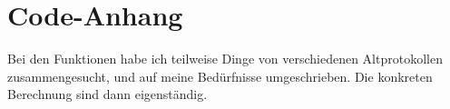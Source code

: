 \section{Code-Anhang}
Bei den Funktionen habe ich teilweise Dinge von verschiedenen Altprotokollen zusammengesucht, und auf meine Bedürfnisse umgeschrieben. Die konkreten Berechnung sind dann eigenständig.


